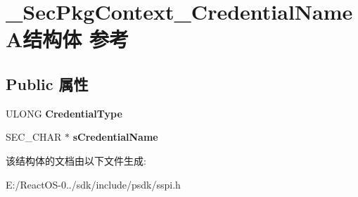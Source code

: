 \hypertarget{struct___sec_pkg_context___credential_name_a}{}\section{\+\_\+\+Sec\+Pkg\+Context\+\_\+\+Credential\+Name\+A结构体 参考}
\label{struct___sec_pkg_context___credential_name_a}
\subsection*{Public 属性}
\begin{DoxyCompactItemize}
\item 
\mbox{\label{struct___sec_pkg_context___credential_name_a_a013a54d98f2ea2ac67e69f70a0dc061d}} 
U\+L\+O\+NG {\bfseries Credential\+Type}
\item 
\mbox{\label{struct___sec_pkg_context___credential_name_a_aaeeb0fcd33e410fce46055939e5a45e9}} 
S\+E\+C\+\_\+\+C\+H\+AR $\ast$ {\bfseries s\+Credential\+Name}
\end{DoxyCompactItemize}


该结构体的文档由以下文件生成\+:\begin{DoxyCompactItemize}
\item 
E\+:/\+React\+O\+S-\/0../sdk/include/psdk/sspi.\+h\end{DoxyCompactItemize}
